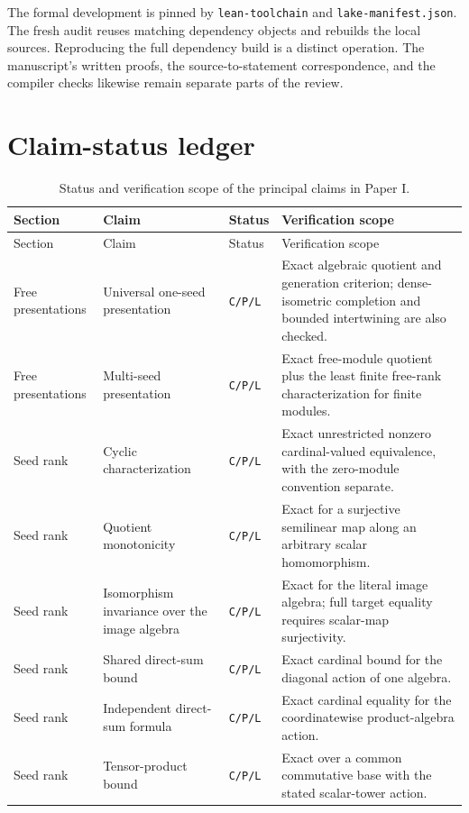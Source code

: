 \documentclass[11pt]{article}
\theoremstyle{definition}
\theoremstyle{remark}
\begin{document}
The formal development is pinned by \texttt{lean-toolchain} and
\texttt{lake-manifest.json}. The fresh audit reuses matching dependency
objects and rebuilds the local sources. Reproducing the full dependency
build is a distinct operation. The manuscript's written proofs, the
source-to-statement correspondence, and the compiler checks likewise
remain separate parts of the review.

\section{Claim-status ledger}\label{app:claim-ledger}

\begingroup
\small
\setlength{\tabcolsep}{3pt}
\begin{longtable}{L{0.16\textwidth}L{0.25\textwidth}L{0.10\textwidth}L{0.38\textwidth}}
\caption{Status and verification scope of the principal claims in Paper I.}
\label{tab:claim-status}\\
\toprule
Section & Claim & Status & Verification scope \\
\midrule
\endfirsthead
\toprule
Section & Claim & Status & Verification scope \\
\midrule
\endhead
Free presentations & Universal one-seed presentation & \texttt{C/P/L} & Exact algebraic quotient and generation criterion; dense-isometric completion and bounded intertwining are also checked. \\
Free presentations & Multi-seed presentation & \texttt{C/P/L} & Exact free-module quotient plus the least finite free-rank characterization for finite modules. \\
Seed rank & Cyclic characterization & \texttt{C/P/L} & Exact unrestricted nonzero cardinal-valued equivalence, with the zero-module convention separate. \\
Seed rank & Quotient monotonicity & \texttt{C/P/L} & Exact for a surjective semilinear map along an arbitrary scalar homomorphism. \\
Seed rank & Isomorphism invariance over the image algebra & \texttt{C/P/L} & Exact for the literal image algebra; full target equality requires scalar-map surjectivity. \\
Seed rank & Shared direct-sum bound & \texttt{C/P/L} & Exact cardinal bound for the diagonal action of one algebra. \\
Seed rank & Independent direct-sum formula & \texttt{C/P/L} & Exact cardinal equality for the coordinatewise product-algebra action. \\
Seed rank & Tensor-product bound & \texttt{C/P/L} & Exact over a common commutative base with the stated scalar-tower action. \\

\end{longtable}
\end{document}
